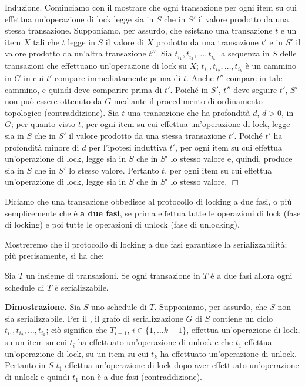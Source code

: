 Induzione. Cominciamo con il mostrare che ogni transazione per ogni item su cui effettua
un'operazione di lock legge sia in $S$ che in $S'$ il valore prodotto da una stessa transazione.
Supponiamo, per assurdo, che esistano una transazione $t$ e un item $X$ tali che $t$ legge in $S$ il valore
di $X$ prodotto da una transazione $t'$ e in $S'$ il valore prodotto da un'altra transazione $t''$. Sia $t_{i_1},
t_{i_2}, \ldots, t_{i_k}$ la sequenza in $S$ delle transazioni che effettuano un'operazione di lock su $X$; $t_{i_1},
t_{i_2}, \ldots, t_{i_k}$ è un cammino in $G$ in cui $t'$ compare immediatamente prima di $t$. Anche $t''$ compare in tale
cammino, e quindi deve comparire prima di $t'$. Poiché in $S'$, $t''$ deve seguire $t'$, $S'$ non può essere
ottenuto da $G$ mediante il procedimento di ordinamento topologico (contraddizione).
Sia $t$ una transazione che ha profondità $d$, $d>0$, in $G$; per quanto visto $t$, per ogni item su cui
effettua un'operazione di lock, legge sia in $S$ che in $S'$ il valore prodotto da una stessa transazione
$t'$. Poiché $t'$ ha profondità minore di $d$ per l'ipotesi induttiva $t'$, per ogni item su cui effettua
un'operazione di lock, legge sia in $S$ che in $S'$ lo stesso valore e, quindi, produce sia in $S$ che in $S'$ lo
stesso valore. Pertanto $t$, per ogni item su cui effettua un'operazione di lock, legge sia in $S$ che in $S'$
lo stesso valore. \hfill $\Box$\\
\begin{defn}
Diciamo che una transazione obbedisce al protocollo di locking a due fasi, o più semplicemente che
è \textbf{a due fasi}, se prima effettua tutte le operazioni di lock (fase di locking) e poi tutte le operazioni di
unlock (fase di unlocking). 
\end{defn}
Mostreremo che il protocollo di locking a due fasi garantisce la serializzabilità; più precisamente, si ha che:
\begin{theo}
Sia $T$ un insieme di transazioni. Se ogni transazione in $T$ è a due fasi allora ogni
schedule di $T$ è serializzabile. 
\end{theo}
\textbf{Dimostrazione.} Sia $S$ uno schedule di $T$. Supponiamo, per assurdo, che $S$ non sia serializzabile. Per il
, il grafo di serializzazione $G$ di $S$ contiene un ciclo $t_{i_1}, t_{i_2}, \ldots,
t_{i_k}$; ciò significa che $T_{i+1}$, $i\in \{1,\ldots k-1\}$, effettua un'operazione di lock, su un item su cui $t_i$
ha effettuato un'operazione di unlock e che $t_1$ effettua un'operazione di lock, su un item su cui $t_k$ ha effettuato
un'operazione di unlock. Pertanto in $S$ $t_1$ effettua un'operazione di lock dopo aver effettuato un'operazione di unlock
e quindi $t_1$ non è a due fasi (contraddizione).\\

